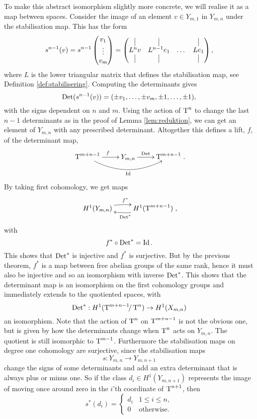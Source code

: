 To make this abstract isomorphism slightly more concrete, we will
realise it as a map between spaces. Consider the image of an element
$v \in Y_{m,1}$ in $Y_{m,n}$ under the stabilisation map. This has the
form 
\[ s^{n-1}(v) = s^{n-1}
\begin{pmatrix}
  v_1 \\
  \vdots \\
  v_m
\end{pmatrix} =
\begin{pmatrix}
  \vrule & \vrule & & \vrule \\
  L^{n} v & L^{n-1}e_1 & \dots & Le_1 \\
  \vrule & \vrule & & \vrule
\end{pmatrix},
\]
where $L$ is the lower triangular matrix that defines the
stabilisation map, see Definition \ref{def:stabilisering}. Computing
the determinants gives
\[ \operatorname{Det}(s^{n-1}(v)) = (\pm v_1,\dots,\pm v_m, \pm 1, \dots,\pm 1), \]
with the signs dependent on $n$ and $m$. Using the action of
$\operatorname{T}^{n}$ to change the last $n-1$ determinants as in the proof of
Lemma \ref{lem:reduktion}, we can get an element of $Y_{m,n}$ with any
prescribed
determinant. Altogether this defines a lift, $f$, of the
determinant map,
\[ \xymatrix{ \T^{m+n-1} \ar[r]^f \ar@/_1.5pc/[rr]_\Id & Y_{m,n}
  \ar[r]^<<<<<\Det & \T^{m+n-1}}. \]
By taking first cohomology, we get maps
\[ \xymatrix{ H^1(Y_{m,n}) \ar@/^/[r]^{f^*} & H^1(\T^{m+n-1})
  \ar@/^/[l]^{\Det^*} }, \]
with 
\[ f^* \circ \operatorname{Det}^* = \operatorname{Id}. \]
This shows that $\operatorname{Det}^*$ is injective and $f^*$ is surjective. But by
the previous theorem, $f^*$ is a map between free abelian groups of
the same rank, hence it must also be injective and so an
isomorphism with inverse $\operatorname{Det}^*$. This shows that the determinant map
is an isomorphism on the first cohomology groups and immediately
extends to the quotiented spaces, with
\[ \operatorname{Det}^* : H^1(\operatorname{T}^{m+n-1}\!\!/\operatorname{T}^{n}) \to H^1(X_{m,n}) \]
an isomorphism. Note that the action of $\operatorname{T}^n$ on $\operatorname{T}^{m+n-1}$ is not
the obvious one, but is given by how the determinants change when
$\operatorname{T}^n$ acts on $Y_{m,n}$. The quotient is still isomorphic to
$\operatorname{T}^{m-1}$. Furthermore the stabilisation
maps on
degree one cohomology are surjective, since the stabilisation maps
\[ s: Y_{m,n} \to Y_{m,n+1} \]
change the signs of some determinants and add an extra determinant
that is always plus or minus one. So if the class $d_i \in
H^1(Y_{m,n+1})$ represents the image of moving once around zero in the
$i$'th coordinate of $\operatorname{T}^{n+1}$, then
\[ s^*(d_i) =
\begin{cases}
  d_i & 1 \leq i \leq n, \\
  0 & \text{otherwise}.
\end{cases} \]


